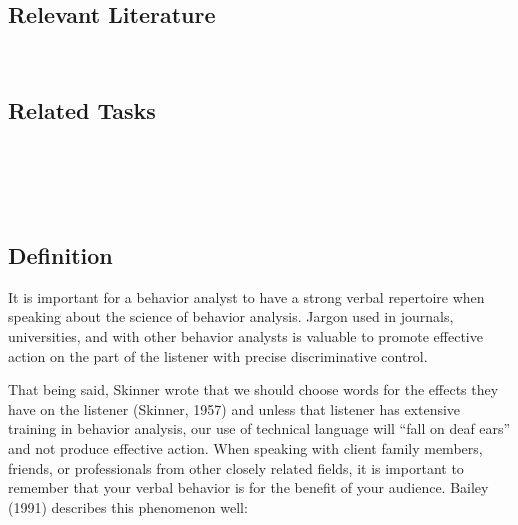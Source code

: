 \subsection{Relevant Literature}
\begin{refsection}
\nocite{test,alang2017police,clayton2018black}
\printbibliography[heading=none]
\end{refsection} 
%
\subsection{Related Tasks} 
\fouriOne{}\\
\fouriTwo{}\\
\fourjOne{}\\
%
%
%
%
%
%
\section[\fourgFour{}]{\fourgFour{}%
              }
\subsection{Definition}
It is important for a behavior analyst to have a strong verbal repertoire when speaking about the science of behavior analysis. Jargon used in journals, universities, and with other behavior analysts is valuable to promote effective action on the part of the listener with precise discriminative control. 

That being said, Skinner wrote that we should choose words for the effects they have on the listener (Skinner, 1957) and unless that listener has extensive training in behavior analysis, our use of technical language will ``fall on deaf ears'' and not produce effective action. When speaking with client family members, friends, or professionals from other closely related fields, it is important to remember that your verbal behavior is for the benefit of your audience. Bailey (1991) describes this phenomenon well:

